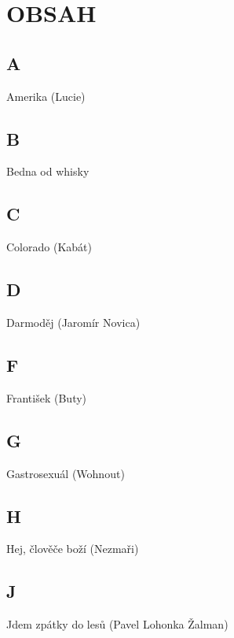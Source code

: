 \section*{\Huge\expandafter\MakeUppercase{Obsah}}

\subsection*{A}
Amerika (Lucie)

\subsection*{B}
Bedna od whisky

\subsection*{C}
Colorado (Kabát)


\subsection*{D}
Darmoděj (Jaromír Novica)

\subsection*{F}
František (Buty)

\subsection*{G}
Gastrosexuál (Wohnout)

\subsection*{H}
Hej, člověče boží (Nezmaři)


\subsection*{J}
Jdem zpátky do lesů (Pavel Lohonka Žalman)

